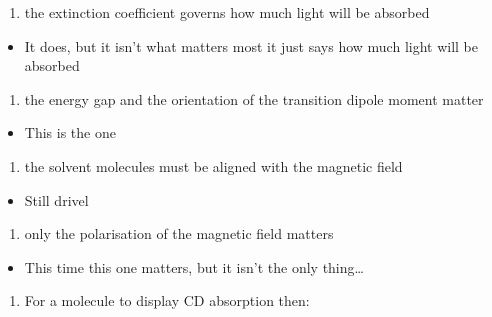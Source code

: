 \documentclass[
]{book}
\providecommand{\tightlist}{%
  \setlength{\itemsep}{0pt}\setlength{\parskip}{0pt}}
\begin{document}
\begin{enumerate}
\def\labelenumi{\alph{enumi}.}
\setcounter{enumi}{2}
\tightlist
\item
  the extinction coefficient governs how much light will be absorbed
\end{enumerate}

\begin{itemize}
\tightlist
\item
  It does, but it isn't what matters most it just says how much light will be absorbed
\end{itemize}

\begin{enumerate}
\def\labelenumi{\alph{enumi}.}
\setcounter{enumi}{3}
\tightlist
\item
  the energy gap and the orientation of the transition dipole moment matter
\end{enumerate}

\begin{itemize}
\tightlist
\item
  This is the one
\end{itemize}

\begin{enumerate}
\def\labelenumi{\alph{enumi}.}
\setcounter{enumi}{4}
\tightlist
\item
  the solvent molecules must be aligned with the magnetic field
\end{enumerate}

\begin{itemize}
\tightlist
\item
  Still drivel
\end{itemize}

\begin{enumerate}
\def\labelenumi{\alph{enumi}.}
\setcounter{enumi}{5}
\tightlist
\item
  only the polarisation of the magnetic field matters
\end{enumerate}

\begin{itemize}
\tightlist
\item
  This time this one matters, but it isn't the only thing\ldots{}
\end{itemize}

\begin{enumerate}
\def\labelenumi{\arabic{enumi}.}
\setcounter{enumi}{1}
\tightlist
\item
  For a molecule to display CD absorption then:
\end{enumerate}
\end{document}
